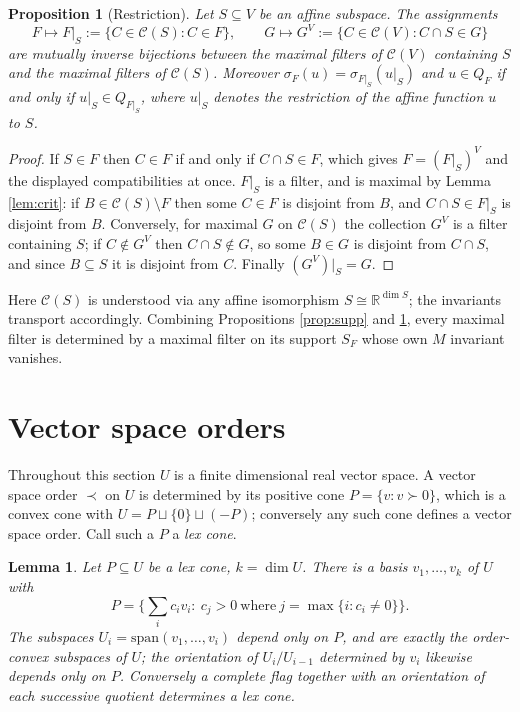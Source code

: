 \documentclass[11pt]{amsart}
\theoremstyle{plain}
\newtheorem{proposition}[theorem]{Proposition}
\newtheorem{lemma}[theorem]{Lemma}
\theoremstyle{definition}
\newcommand{\CC}{\mathscr{C}}
\newcommand{\RR}{\mathbb{R}}
\begin{document}
\begin{proposition}[Restriction]\label{prop:restrict}
Let $S\subseteq V$ be an affine subspace. The assignments
\[
F\mapsto F|_S:=\{C\in\CC(S):C\in F\},\qquad G\mapsto G^{V}:=\{C\in\CC(V):C\cap S\in G\}
\]
are mutually inverse bijections between the maximal filters of $\CC(V)$ containing $S$ and the maximal filters of $\CC(S)$. Moreover $\sigma_{F}(u)=\sigma_{F|_S}(u|_S)$ and $u\in Q_F$ if and only if $u|_S\in Q_{F|_S}$, where $u|_S$ denotes the restriction of the affine function $u$ to $S$.
\end{proposition}

\begin{proof}
If $S\in F$ then $C\in F$ if and only if $C\cap S\in F$, which gives $F=(F|_S)^{V}$ and the displayed compatibilities at once. $F|_S$ is a filter, and is maximal by Lemma \ref{lem:crit}: if $B\in\CC(S)\setminus F$ then some $C\in F$ is disjoint from $B$, and $C\cap S\in F|_S$ is disjoint from $B$. Conversely, for maximal $G$ on $\CC(S)$ the collection $G^V$ is a filter containing $S$; if $C\notin G^{V}$ then $C\cap S\notin G$, so some $B\in G$ is disjoint from $C\cap S$, and since $B\subseteq S$ it is disjoint from $C$. Finally $(G^{V})|_S=G$.
\end{proof}

Here $\CC(S)$ is understood via any affine isomorphism $S\cong\RR^{\dim S}$; the invariants transport accordingly. Combining Propositions \ref{prop:supp} and \ref{prop:restrict}, every maximal filter is determined by a maximal filter on its support $S_F$ whose own $M$ invariant vanishes.

\section{Vector space orders}\label{sec:orders}

Throughout this section $U$ is a finite dimensional real vector space. A vector space order $\prec$ on $U$ is determined by its positive cone $P=\{v:v\succ0\}$, which is a convex cone with $U=P\sqcup\{0\}\sqcup(-P)$; conversely any such cone defines a vector space order. Call such a $P$ a \emph{lex cone}.

\begin{lemma}\label{lem:lex}
Let $P\subseteq U$ be a lex cone, $k=\dim U$. There is a basis $v_1,\dots,v_k$ of $U$ with
\[
P=\Big\{\textstyle\sum_i c_iv_i:\ c_j>0\ \text{where}\ j=\max\{i:c_i\neq0\}\Big\}.
\]
The subspaces $U_i=\mathrm{span}(v_1,\dots,v_i)$ depend only on $P$, and are exactly the order-convex subspaces of $U$; the orientation of $U_i/U_{i-1}$ determined by $v_i$ likewise depends only on $P$. Conversely a complete flag together with an orientation of each successive quotient determines a lex cone.
\end{lemma}
\end{document}
